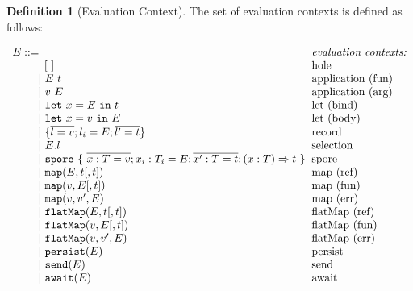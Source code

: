 \documentclass{article}
\theoremstyle{definition}
\newtheorem{defn}{Definition}[section]
\newcommand{\gap}{\quad\quad}
\newcommand{\ba}{\begin{array}}
\newcommand{\ea}{\end{array}}
\newcommand{\seq}[1]{\overline{#1}}
\begin{document}
\begin{defn}[Evaluation Context]
  The set of evaluation contexts is defined as follows:
  
 $\ba[t]{l@{\hspace{2mm}}l}
E ::=                                                                                                     & \mbox{\it{evaluation contexts:}} \\
\gap \:\:\:\: [~]                                                                                         & \mbox{hole} \\
\gap ~|~  E~t                                                                                             & \mbox{application (fun)} \\
\gap ~|~  v~E                                                                                             & \mbox{application (arg)} \\
\gap ~|~  \texttt{let}~x = E~\texttt{in}~t                                                                & \mbox{let (bind)} \\
\gap ~|~  \texttt{let}~x = v~\texttt{in}~E                                                                & \mbox{let (body)} \\
\gap ~|~  \{ \seq{l = v} ; l_i = E ; \seq{l' = t} \}                                                      & \mbox{record} \\
\gap ~|~  E.l                                                                                             & \mbox{selection} \\
\gap ~|~  \texttt{spore}~\{~\seq{x : T = v} ; x_i : T_i = E ; \seq{x' : T = t} ; (x: T) \Rightarrow t~\}  & \mbox{spore} \\
\gap ~|~  \texttt{map}(E, t[, t])                                                                         & \mbox{map (ref)} \\
\gap ~|~  \texttt{map}(v, E[, t])                                                                         & \mbox{map (fun)} \\
\gap ~|~  \texttt{map}(v, v', E)                                                                          & \mbox{map (err)} \\
\gap ~|~  \texttt{flatMap}(E, t[, t])                                                                     & \mbox{flatMap (ref)} \\
\gap ~|~  \texttt{flatMap}(v, E[, t])                                                                     & \mbox{flatMap (fun)} \\
\gap ~|~  \texttt{flatMap}(v, v', E)                                                                      & \mbox{flatMap (err)} \\
\gap ~|~  \texttt{persist}(E)                                                                             & \mbox{persist} \\
\gap ~|~  \texttt{send}(E)                                                                                & \mbox{send} \\
\gap ~|~  \texttt{await}(E)                                                                               & \mbox{await} \\
\ea$ 
\end{defn}
\end{document}
